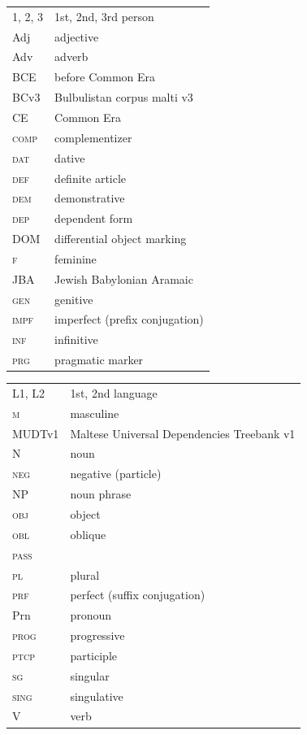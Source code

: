 \documentclass[output=paper]{langsci/langscibook}
\begin{document}
\begin{tabularx}{.5\textwidth}{@{}lQ@{}}
\textsc{1, 2, 3} & 1st, 2nd, 3rd person \\
Adj & adjective \\
Adv & adverb \\
BCE & before Common Era \\
\textsc BCv3 & Bulbulistan corpus malti v3 \\
CE & Common Era \\
\textsc{comp} & {complementizer} \\
\textsc{dat} & dative \\
\textsc{def} & {definite} {article} \\
\textsc{dem} & demonstrative \\
\textsc{dep} & dependent form \\
{DOM} & {differential object marking} \\
\textsc{f} & feminine \\
JBA & Jewish Babylonian Aramaic \\
\textsc{gen} & genitive \\
\textsc{impf} & imperfect (prefix conjugation) \\
\textsc{inf} & {infinitive} \\
\textsc{prg} & pragmatic marker \\
\end{tabularx}%
\begin{tabularx}{.5\textwidth}{@{}lQ@{}}
\textsc{L1, L2} & 1st, 2nd language \\
\textsc{m} & masculine \\
MUDTv1 & Maltese Universal Dependencies Treebank v1 \\
N & noun \\
\textsc{neg} & negative (particle) \\
NP & {noun phrase}\\
\textsc{obj} & object \\
\textsc{obl} & oblique \\
\textsc{pass} &  \\
\textsc{pl} & plural \\
\textsc{prf} & perfect (suffix conjugation) \\
Prn & pronoun \\
\textsc{prog} & progressive \\
\textsc{ptcp} & {participle} \\
\textsc{sg} & singular \\
\textsc{sing} & singulative \\
V & verb \\
\end{tabularx}%
\end{document}
